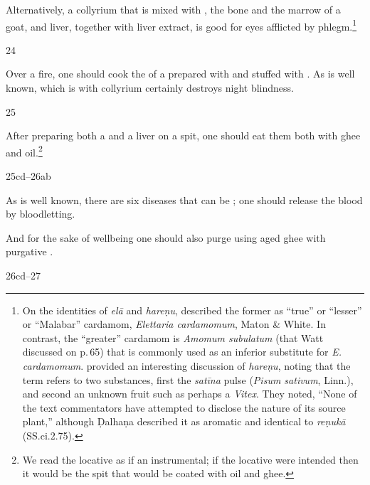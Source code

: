 \begin{translation}
    Alternatively, a collyrium that is  mixed with
, the bone and the marrow of a goat,
 and liver, together with liver extract, is good for eyes
afflicted by phlegm.\footnote{On the identities of \emph{elā} and
\emph{hareṇu}, \citet[511\,ff]{watt-comm} described the former as “true” or
“lesser” or “Malabar” cardamom, \emph{Elettaria cardamomum}, Maton \& White. 
In contrast, the “greater” cardamom is \textit{Amomum subulatum} (that Watt
discussed on p.\,65) that is commonly used as an inferior substitute for \textit{E.
cardamomum}. \citet[467\,f]{sing-1972} provided an interesting discussion of
\emph{hareṇu}, noting that the term refers to two substances, first the
\emph{satīna} pulse (\emph{Pisum sativum}, Linn.), and second an unknown fruit such
as perhaps a \emph{Vitex}. They noted, “None of the text commentators have attempted
to disclose the nature of its source plant,” although Ḍalhaṇa described it as
aromatic and identical to \emph{reṇukā} (SS.ci.2.75).%
}
    
    \item[24] 
    
    Over a fire, one should cook the  of a  
    prepared
    with  and stuffed with .  As is well 
    known,  which is  with collyrium certainly 
    destroys night blindness.
    
    
    \item [25] 
    
    After preparing both a  and a liver on a spit, one should eat them
    both with ghee and oil.\footnote{We read the locative as if an instrumental; if the
    locative were intended then it would be the spit that would be coated with oil and
    ghee.}
    
    \item [25cd--26ab]
    
    As is well known, there are  six diseases that can be ;
     one should release the blood by bloodletting.
    
    And for the sake of wellbeing one should also purge using aged ghee 
     with 
    purgative . 
    
    \item[26cd--27]
    

\end{translation}
